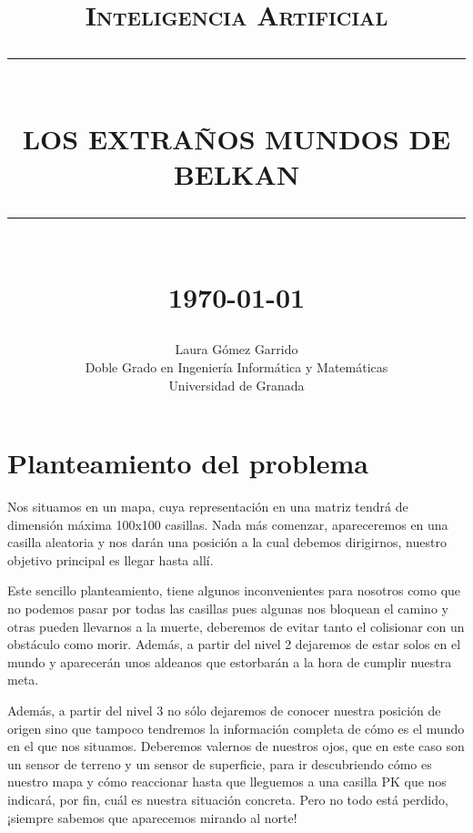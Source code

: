 \documentclass[12pt]{article}
\newcommand{\HRule}[1]{\rule{\linewidth}{#1}}
\begin{document}
\title{ \normalsize \textsc{Inteligencia Artificial}
		\\ [2.0cm]
		\HRule{0.5pt} \\
		\LARGE \textbf{\uppercase{Los extraños mundos de Belkan}}
		\HRule{2pt} \\ [0.5cm]
		\normalsize \today \vspace*{5\baselineskip}}

\date{}

\author{
		Laura Gómez Garrido \\
		Doble Grado en Ingeniería Informática y Matemáticas \\
		Universidad de Granada }

\maketitle

\newpage

\sectionfont{\scshape}


\section{Planteamiento del problema}
Nos situamos en un mapa, cuya representación en una matriz tendrá de dimensión máxima 100x100 casillas. Nada más comenzar, apareceremos en una casilla aleatoria y nos darán una posición a la cual debemos dirigirnos, nuestro objetivo principal es llegar hasta allí. 

Este sencillo planteamiento, tiene algunos inconvenientes para nosotros como que no podemos pasar por todas las casillas pues algunas nos bloquean el camino y otras pueden llevarnos a la muerte, deberemos de evitar tanto el colisionar con un obstáculo como morir. Además, a partir del nivel 2 dejaremos de estar solos en el mundo y aparecerán unos aldeanos que estorbarán a la hora de cumplir nuestra meta.

Además, a partir del nivel 3 no sólo dejaremos de conocer nuestra posición de origen sino que tampoco tendremos la información completa de cómo es el mundo en el que nos situamos. Deberemos valernos de nuestros ojos, que en este caso son un sensor de terreno y un sensor de superficie, para ir descubriendo cómo es nuestro mapa y cómo reaccionar hasta que lleguemos a una casilla PK que nos indicará, por fin, cuál es nuestra situación concreta. Pero no todo está perdido, ¡siempre sabemos que aparecemos mirando al norte!
\end{document}
